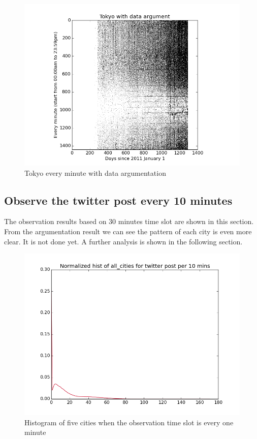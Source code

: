 \documentclass[a4paper,12pt]{article}
\begin{document}
   \begin{figure}[H]
  \begin{center}
      \includegraphics[scale=0.8]{Tokyobinary.png}
\end{center}
\caption{Tokyo every minute with data argumentation}
 \label {fig:2}
 \end{figure}
 
 \subsection{Observe the twitter post every 10 minutes}
 
 The observation results based on 30 minutes time slot are shown in this section. From the argumentation result we can see the pattern of each city is even more clear. It is not done yet. A further analysis is shown in the following section.\\
\begin{figure}[H]
  \begin{center}
      \includegraphics[scale=0.8]{1all_citieshisto.png}
\end{center}
\caption{Histogram of five cities when the observation time slot is every one minute}
 \label {fig:2}
 \end{figure}
\end{document}
